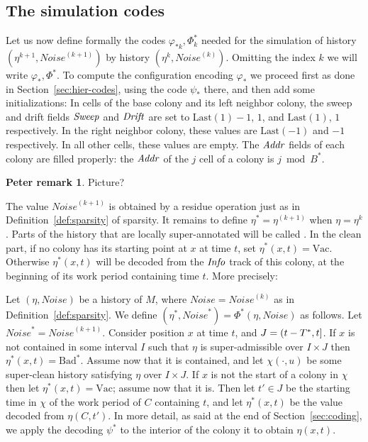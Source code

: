 \documentclass[11pt]{memoir}
\newcommand{\authnote}[3]
{\text{{ \textcolor{#3}{\( \langle\hspace{-0.2em}\langle \)\textsf{\footnotesize #1: #2}\( \rangle\hspace{-0.2em}\rangle \)}}}}
\newcommand{\authnote}[2]{}
\newcommand{\Pnote}[1]{{\authnote{P}{#1}{cyan}}}
\theoremstyle{definition} %
\newtheorem{Premark}{\color{cyan}Peter remark}
\newenvironment{premark}{\begin{Premark}\color{cyan}}{\varqed\end{Premark}}
\renewcommand{\Pnote}[1]{\begin{premark}#1\end{premark}}
\newcommand{\fld}[1]{\ensuremath{\textit{#1\/}}}
\def\B{B}
\newcommand{\Bad}{\mathrm{Bad}}
\newcommand{\Vacant}{\mathrm{Vac}}
\newcommand{\Noise}{\mathit{Noise}}
\newcommand{\Tus}{T^{*}}
\newcommand{\Addr}{\fld{Addr}}
\newcommand{\Drift}{\fld{Drift}}
\newcommand{\Info}{\fld{Info}}
\newcommand{\Sweep}{\fld{Sweep}}
\newcommand{\Last}{\mathrm{Last}}
\begin{document}
\subsection{The simulation codes}\label{sec:sim-codes}

Let us now define formally the codes \( \varphi_{*k},\Phi_{k}^{*} \) needed
for the simulation of history \( (\eta^{k+1},\Noise^{(k+1)}) \) by history \( (\eta^{k},\Noise^{(k)}) \).
Omitting the index \( k \) we will write \( \varphi_{*},\Phi^{*} \).
To compute the configuration encoding \( \varphi_{*} \) we proceed first as
done in Section~\ref{sec:hier-codes}, using the code \( \psi_{*} \) there,
and then add some initializations:
In cells of the base colony and its left neighbor  colony,
the sweep and drift fields \( \Sweep \) and \( \Drift \) are set 
to \( \Last(1)-1 \),  \( 1 \), and \( \Last(1) \),  \( 1 \) respectively.
In the right neighbor colony, these values are \( \Last(-1) \) and \( -1 \) respectively.
In all other cells, these values are empty.
The \( \Addr \) fields of each colony are filled properly:
the \( \Addr \) of the \( j \) cell of a colony
is \( j \bmod \B^{*} \). \Pnote{Picture?}

The value \( \Noise^{(k+1)} \) is obtained by a residue operation
just as in Definition~\ref{def:sparsity} of sparsity.
It remains to define \( \eta^{*}=\eta^{(k+1)} \) when \( \eta=\eta^{k} \).
Parts of the history that are locally super-annotated will be called .
In the clean part,
if no colony has its starting point at \( x \) at time \( t \), set \( \eta^{*}(x,t)=\Vacant \).
Otherwise \( \eta^{*}(x,t) \) will be decoded from
the \( \Info \) track of this colony, at the beginning of its work period 
containing time \( t \).
More precisely:

\begin{definition}[Scale-up]\label{def:scaleup}
Let \( (\eta,\Noise) \) be a history of \( M \), where \( \Noise=\Noise^{(k)} \)
as in Definition~\ref{def:sparsity}.
We define \( (\eta^{*},\Noise^{*})=\Phi^{*}(\eta,\Noise) \) as follows.
Let \( \Noise^{*}=\Noise^{(k+1)} \).
Consider position \( x \) at time \( t \), and \( J=\rint{t-\Tus}{t} \).
If \( x \) is not contained in some interval \( I \) such that \( \eta \) is super-admissible over \( I\times J \)
then \( \eta^{*}(x,t)=\Bad^{*} \).
Assume now that it is contained, and let
\( \chi(\cdot,u) \) be some super-clean history satisfying \( \eta \) over \( I\times J \).
If \( x \) is not the start of a colony in \( \chi \) then let \( \eta^{*}(x,t)=\Vacant \); assume now that it is.
Then let \( t'\in J \) be the starting time in \( \chi \) of the work period of \( C \)
containing \( t \), and let \( \eta^{*}(x,t) \) be the value decoded from \( \eta(C,t') \).
In more detail, as said at the end of Section~\ref{sec:coding}, we apply the decoding
\( \psi^{*} \) to the interior of the colony it to obtain \( \eta(x,t) \).
\end{definition}
\end{document}
